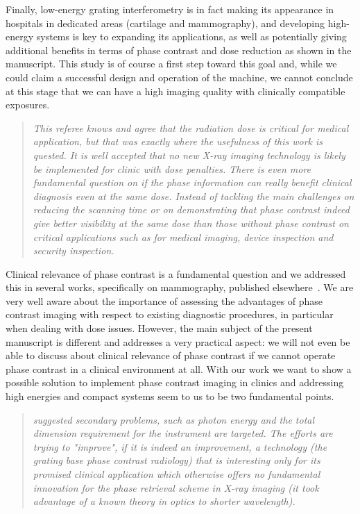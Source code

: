 \documentclass[a4paper,english]{scrartcl}
\newenvironment{reviewerquote}{\begin{quote}\itshape}{\end{quote}}
\begin{document}
Finally, low-energy grating interferometry is in fact making its appearance
in hospitals in dedicated areas (cartilage and mammography), and developing
high-energy systems is key to expanding its applications, as well as
potentially giving
additional benefits in terms of phase contrast and dose reduction as shown
in the manuscript.
This study is of course a first step toward this goal and,
while we could claim a successful design and operation of the machine, we
cannot conclude at this stage that we can have a high imaging quality with
clinically compatible exposures.

\begin{reviewerquote}
This referee knows and agree that the radiation dose is critical
for medical application, but that was exactly where the usefulness of this
work is quested. It is well accepted that no new X-ray imaging technology is
likely be implemented for clinic with dose penalties. There is even more
fundamental question on if the phase information can really benefit clinical
diagnosis even at the same dose. Instead of tackling the main challenges on
reducing the scanning time or on demonstrating that phase contrast indeed
give better visibility at the same dose than those without phase contrast on
critical applications such as for medical imaging, device inspection and
security inspection.
\end{reviewerquote}

Clinical relevance of phase contrast is a fundamental question
and we addressed this in several works, specifically on mammography,
published elsewhere~\cite{Stampanoni2011,Donath2010a,Wang2014}. We are very well aware
about the importance of assessing the advantages of phase contrast imaging
with respect to existing diagnostic procedures, in particular when dealing
with dose issues. However, the main subject of the present manuscript is
different and addresses a very practical aspect: we will not even be able to
discuss about clinical relevance of phase contrast if we cannot operate
phase contrast in a clinical environment at all. With our work we want to
show a possible solution to implement phase contrast imaging in clinics and
addressing high energies and compact systems seem to us to be two
fundamental points. 

\begin{reviewerquote}
suggested secondary problems, such as photon energy and the
total dimension requirement for the instrument are targeted. The efforts are
trying to "improve", if it is indeed an improvement, a technology (the
grating base phase contrast radiology) that is interesting only for its
promised clinical application which otherwise offers no fundamental
innovation for the phase retrieval scheme in X-ray imaging (it took
advantage of a known theory in optics to shorter wavelength).
\end{reviewerquote}
\end{document}
